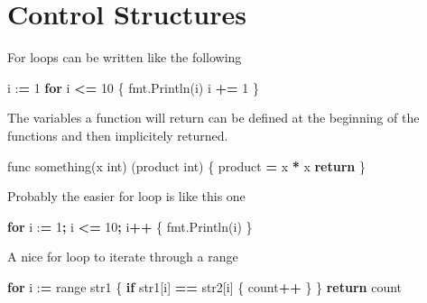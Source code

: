 \documentclass[]{book}
\newenvironment{Shaded}{\begin{snugshade}}{\end{snugshade}}
\newcommand{\DecValTok}[1]{\textcolor[rgb]{0.00,0.00,0.81}{#1}}
\newcommand{\ControlFlowTok}[1]{\textcolor[rgb]{0.13,0.29,0.53}{\textbf{#1}}}
\newcommand{\OperatorTok}[1]{\textcolor[rgb]{0.81,0.36,0.00}{\textbf{#1}}}
\newcommand{\BuiltInTok}[1]{#1}
\newcommand{\NormalTok}[1]{#1}
\begin{document}
\section{Control Structures}\label{control-structures}

For loops can be written like the following

\begin{Shaded}
\begin{Highlighting}[]
\NormalTok{i :}\OperatorTok{=} \DecValTok{1}
\ControlFlowTok{for}\NormalTok{ i }\OperatorTok{<=} \DecValTok{10}\NormalTok{ \{}
\NormalTok{    fmt.Println(i)}
\NormalTok{    i }\OperatorTok{+=} \DecValTok{1}
\NormalTok{\}}
\end{Highlighting}
\end{Shaded}

The variables a function will return can be defined at the beginning of
the functions and then implicitely returned.

\begin{Shaded}
\begin{Highlighting}[]
\NormalTok{func something(x }\BuiltInTok{int}\NormalTok{) (product }\BuiltInTok{int}\NormalTok{) \{}
\NormalTok{    product }\OperatorTok{=}\NormalTok{ x }\OperatorTok{*}\NormalTok{ x}
    \ControlFlowTok{return}
\NormalTok{\}}
\end{Highlighting}
\end{Shaded}

Probably the easier for loop is like this one

\begin{Shaded}
\begin{Highlighting}[]
\ControlFlowTok{for}\NormalTok{ i :}\OperatorTok{=} \DecValTok{1}\OperatorTok{;}\NormalTok{ i }\OperatorTok{<=} \DecValTok{10}\OperatorTok{;}\NormalTok{ i}\OperatorTok{++}\NormalTok{ \{}
\NormalTok{    fmt.Println(i)}
\NormalTok{\}}
\end{Highlighting}
\end{Shaded}

A nice for loop to iterate through a range

\begin{Shaded}
\begin{Highlighting}[]
\ControlFlowTok{for}\NormalTok{ i :}\OperatorTok{=} \BuiltInTok{range}\NormalTok{ str1 \{}
    \ControlFlowTok{if}\NormalTok{ str1[i] }\OperatorTok{==}\NormalTok{ str2[i] \{ count}\OperatorTok{++}\NormalTok{ \}}
\NormalTok{\}}
\ControlFlowTok{return}\NormalTok{ count}
\end{Highlighting}
\end{Shaded}
\end{document}
